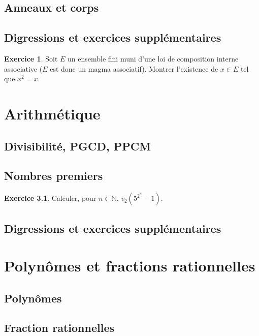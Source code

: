 \documentclass[12pt,a4paper]{book}
\theoremstyle{definition}
\newtheorem{exo}{Exercice}[section]
\theoremstyle{remark}
\newcommand{\N}{\mathbb{N}}
\begin{document}
\section{Anneaux et corps}

\section{Digressions et exercices supplémentaires}

\begin{exo}
    Soit $E$ un ensemble fini muni d'une loi de composition interne associative ($E$ est donc un magma associatif). Montrer l'existence de $x \in E$ tel que $x^2 = x$.
\end{exo}

\chapter{Arithmétique}

\section{Divisibilité, PGCD, PPCM}

\section{Nombres premiers}

\begin{exo}
    Calculer, pour $n \in \N$, $v_2(5^{2^n} - 1)$.
\end{exo}

\section{Digressions et exercices supplémentaires}


\chapter{Polynômes et fractions rationnelles}

\section{Polynômes}

\section{Fraction rationnelles}
\end{document}
